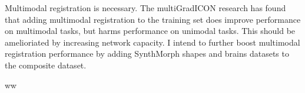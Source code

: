 \documentclass{article}
\begin{document}
Multimodal registration is necessary. The multiGradICON research has found that adding multimodal registration to the training set does improve performance on multimodal tasks, but harms performance on unimodal tasks. This should be amelioriated by increasing network capacity. I intend to further boost multimodal registration performance by adding SynthMorph shapes and brains datasets to the composite dataset.

ww








\end{document}
